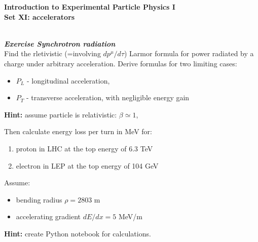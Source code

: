 \documentclass[11pt,a4paper]{article}
\newcounter{zadanie}\newcommand{\zadanie}[1][]{\addtocounter{zadanie}{1} ~\\  {\bf \emph{Exercise \arabic{zadanie} #1 }} \\}
\begin{document}
         

\begin{centering}
  {\bf {\Large
 Introduction to Experimental Particle Physics I \\
  Set XI: accelerators \\
  }}   
\end{centering}

\vspace{1cm}
\zadanie[Synchrotron radiation]

Find the rletivistic (=involving $dp^{\mu}/d\tau$) Larmor formula for power radiated by a charge under arbitrary acceleration. 
Derive formulas for two limiting cases:
\begin{itemize}
  \item $P_{L}$ - longitudinal acceleration,
  \item $P_{T}$ - transverse acceleration, with negligible energy gain
\end{itemize}

\vspace{0.5cm}

{\bf Hint:} assume particle is relativistic: 
$\beta \simeq 1$, 

\vspace{0.5cm}

Then calculate energy loss per turn in MeV for:
\begin{enumerate}
  \item proton in LHC at the top energy of 6.3 TeV
  \item electron in LEP at the top energy of 104 GeV
\end{enumerate}

Assume:
\begin{itemize}
  \item bending radius $\rho = 2803$ m 
  \item accelerating gradient $dE/dx = 5$ MeV/m
\end{itemize}

{\bf Hint:} create Python notebook for calculations. 
\end{document}
